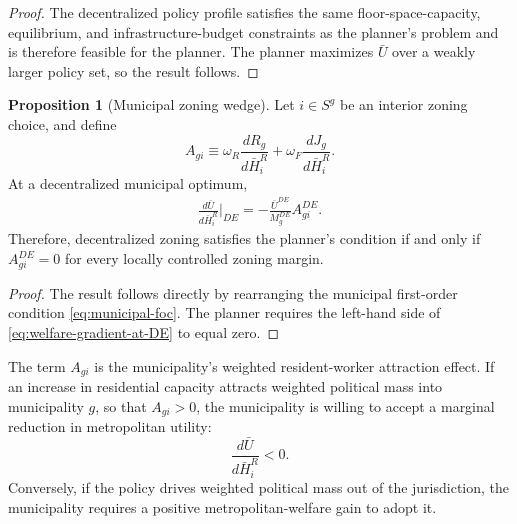 \documentclass[12pt, a4paper]{article}
\theoremstyle{definition}
\newtheorem{proposition}{Proposition}
\theoremstyle{remark}
\begin{document}
\begin{proof}
The decentralized policy profile satisfies the same floor-space-capacity, equilibrium, and infrastructure-budget constraints as the planner's problem and is therefore feasible for the planner. The planner maximizes $\bar U$ over a weakly larger policy set, so the result follows.
\end{proof}

\begin{proposition}[Municipal zoning wedge]
\label{prop:municipal-wedge}
Let $i\in S^g$ be an interior zoning choice, and define
\[
A_{gi}
\equiv
\omega_R\frac{dR_g}{d\bar H_i^R}
+
\omega_F\frac{dJ_g}{d\bar H_i^R}.
\]
At a decentralized municipal optimum,
\begin{align}
    \label{eq:welfare-gradient-at-DE}
    \frac{d\bar U}{d\bar H_i^R}\bigg|_{DE}
    =
    -
    \frac{\bar U^{DE}}{M_g^{DE}}A_{gi}^{DE}.
\end{align}
Therefore, decentralized zoning satisfies the planner's condition if and only if $A_{gi}^{DE}=0$ for every locally controlled zoning margin.
\end{proposition}

\begin{proof}
The result follows directly by rearranging the municipal first-order condition \eqref{eq:municipal-foc}. The planner requires the left-hand side of \eqref{eq:welfare-gradient-at-DE} to equal zero.
\end{proof}

The term $A_{gi}$ is the municipality's weighted resident-worker attraction effect. If an increase in residential capacity attracts weighted political mass into municipality $g$, so that $A_{gi}>0$, the municipality is willing to accept a marginal reduction in metropolitan utility:
\[
\frac{d\bar U}{d\bar H_i^R}<0.
\]
Conversely, if the policy drives weighted political mass out of the jurisdiction, the municipality requires a positive metropolitan-welfare gain to adopt it.
\end{document}
